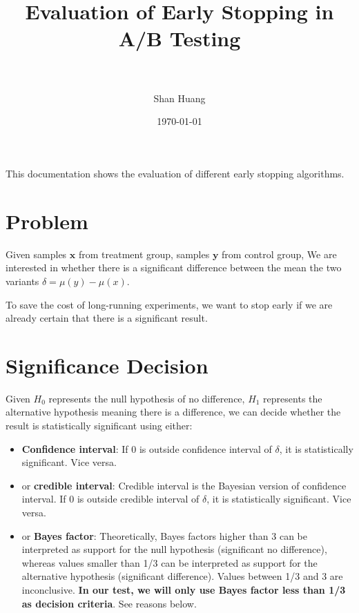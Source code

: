 \documentclass[paper=a4, fontsize=11pt]{scrartcl} %
\title{	
\normalfont \normalsize 
\textsc{} \\ [25pt] %
\horrule{0.5pt} \\[0.4cm] %
\huge Evaluation of Early Stopping in A/B Testing  \\ %
\horrule{2pt} \\[0.5cm] %
}
\author{Shan Huang} %
\date{\normalsize\today} %
\numberwithin{equation}{section} %
\numberwithin{figure}{section} %
\numberwithin{table}{section} %
\begin{document}
\maketitle %


This documentation shows the evaluation of different early stopping algorithms. 

\section{Problem}
Given samples $\textbf{x}$ from treatment group, samples $\textbf{y}$ from control group, We are interested in whether there is a significant difference  between the mean the two variants $\delta = \mu(y)-\mu(x)$.

To save the cost of long-running experiments, we want to stop early if we are already certain that there is a significant result.

\section{Significance Decision}
\label{sec:byt}
Given $H_0$ represents the null hypothesis of no difference, $H_1$ represents the alternative hypothesis meaning there is a difference, we can decide whether the result is statistically significant using either:

\begin{itemize}  
\item \textbf{Confidence interval}: If 0 is outside confidence interval of $\delta$, it is statistically significant. Vice versa.
\item or \textbf{credible interval}: Credible interval is the Bayesian version of confidence interval. If 0 is outside credible interval of $\delta$, it is statistically significant. Vice versa.
\item or \textbf{Bayes factor}: Theoretically, Bayes factors higher than 3 can be interpreted as support for the null hypothesis (significant no difference), whereas values smaller than 1/3 can be interpreted as support for the alternative hypothesis (significant difference). Values between 1/3 and 3 are inconclusive. \textbf{In our test, we will only use Bayes factor less than 1/3 as decision criteria}. See reasons below.
\end{itemize}
\end{document}
